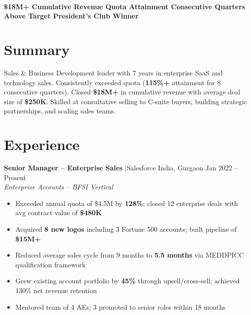 \documentclass[10pt,a4paper]{article}
\newcommand{\num}[1]{{\bfseries\color{accent}#1}}
\begin{document}
\\[2pt]

\vspace{4pt}
\noindent\colorbox{lightred}{\parbox{\dimexpr\textwidth-2\fboxsep}{%
\centering\small\bfseries\vspace{3pt}
\num{\$18M+} Cumulative Revenue \quad\textbar\quad \num{128\%} Quota Attainment \quad\textbar\quad \num{8} Consecutive Quarters Above Target \quad\textbar\quad \num{3x} President's Club Winner
\vspace{3pt}}}

\section{Summary}
Sales \& Business Development leader with 7 years in enterprise SaaS and technology sales. Consistently exceeded quota (\num{115\%+} attainment for 8 consecutive quarters). Closed \num{\$18M+} in cumulative revenue with average deal size of \num{\$250K}. Skilled at consultative selling to C-suite buyers, building strategic partnerships, and scaling sales teams.

\section{Experience}

\textbf{Senior Manager -- Enterprise Sales} \quad|\quad Salesforce India, Gurgaon \hfill Jan 2022 -- Present\\
{\small\itshape Enterprise Accounts -- BFSI Vertical}
\begin{itemize}
  \item Exceeded annual quota of \$4.5M by \num{128\%}; closed 12 enterprise deals with avg contract value of \num{\$480K}
  \item Acquired \num{8 new logos} including 3 Fortune 500 accounts; built pipeline of \num{\$15M+}
  \item Reduced average sales cycle from 9 months to \num{5.5 months} via MEDDPICC qualification framework
  \item Grew existing account portfolio by \num{45\%} through upsell/cross-sell; achieved 130\% net revenue retention
  \item Mentored team of 4 AEs; 3 promoted to senior roles within 18 months
\end{itemize}
\end{document}
